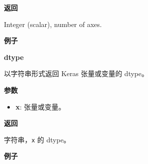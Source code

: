 \textbf{返回}

Integer (scalar), number of axes.

\textbf{例子}

\begin{Shaded}
\begin{Highlighting}[]
\OperatorTok{>>>}    
\OperatorTok{>>>} \OperatorTok{=} \OperatorTok{=}\NormalTok{(}\NormalTok{, }\NormalTok{, }\NormalTok{))}
\OperatorTok{>>>} \OperatorTok{=} \NormalTok{np.array([[}\NormalTok{, }\NormalTok{], [}\NormalTok{, }\NormalTok{]])}
\OperatorTok{>>>} \OperatorTok{=} \OperatorTok{=}
\OperatorTok{>>>} 
\OperatorTok{>>>} 
\end{Highlighting}
\end{Shaded}


\textbf{dtype}\label{dtype}

\begin{Shaded}
\begin{Highlighting}[]
\end{Highlighting}
\end{Shaded}

以字符串形式返回 Keras 张量或变量的 dtype。

\textbf{参数}

\begin{itemize}
\tightlist
\item
  \textbf{x}: 张量或变量。
\end{itemize}

\textbf{返回}

字符串，\texttt{x} 的 dtype。

\textbf{例子}

